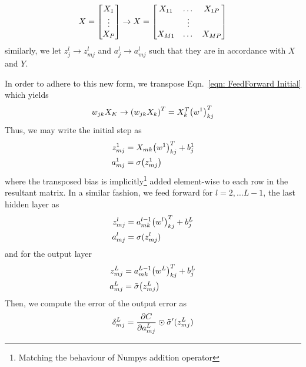 \documentclass[reprint, english, nofootinbib]{revtex4-2}
\begin{document}
\begin{equation}
    X = \qty[
    \begin{matrix}
        X_1 \\ \vdots \\ X_P
    \end{matrix}
    ] \rightarrow
    X = \qty[
    \begin{matrix}
        X_{11} & \dots & X_{1P} \\
                 & \vdots&          \\
        X_{M1} & \dots & X_{MP}
    \end{matrix}
    ]
\end{equation}
similarly, we let $z^l_j \rightarrow z^l_{mj}$ and $a^l_{j}\rightarrow a^l_{mj}$ such that they are in accordance with $X$ and $Y$.

In order to adhere to this new form, we transpose Eqn.~\ref{eqn: FeedForward Initial} which yields
\begin{equation}
    w_{jk}X_K \rightarrow \qty(w_{jk}X_k)^T = X_k^T \qty(w^1)^T_{kj}
\end{equation}
Thus, we may write the initial step as
\begin{align}
    \begin{split}
        z^1_{mj} &= X_{mk}\qty(w^{1})^T_{kj} + b^1_j \\
        a^1_{mj} &= \sigma\qty(z^1_{mj})
    \end{split}
\end{align}
where the transposed bias is implicitly\footnote{Matching the behaviour of Numpys addition operator} added element-wise to each row in the resultant matrix. In a similar fashion, we feed forward for $l = 2, \dots L-1$, the last hidden layer as
\begin{align}
    \begin{split}
        z^l_{mj} &= a^{l-1}_{mk}\qty(w^l)^T_{kj} + b^L_j \\
        a^l_{mj} &= \sigma(z^l_{mj})
    \end{split}
\end{align}
and for the output layer
\begin{align}
    \begin{split}
        z^L_{mj} &= a^{L-1}_{mk}\qty(w^L)^T_{kj} + b^L_j \\
        a^L_{mj} &= \tilde\sigma\qty(z^L_{mj})
    \end{split}
\end{align}
Then, we compute the error of the output error as
\begin{equation}
    \delta^L_{mj} = \pdv{C}{a^L_{mj}} \odot \tilde\sigma'(z^L_{mj})
\end{equation}
\end{document}
